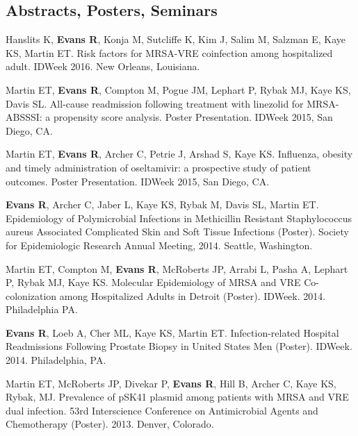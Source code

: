 \documentclass[10pt]{res} %
\begin{document}
\begin{resume}
\subsection{Abstracts, Posters, Seminars} 

\vspace{10pt}

Hanslits K, \textbf{Evans R}, Konja M, Sutcliffe K, Kim J, Salim M, Salzman E, Kaye KS,
Martin ET. Risk factors for MRSA-VRE coinfection among hospitalized adult.
IDWeek 2016. New Orleans, Louisiana.

\vspace{5pt}

Martin ET, \textbf{Evans R}, Compton M, Pogue JM, Lephart P, Rybak MJ, Kaye KS,
Davis SL. All-cause readmission following treatment with linezolid for MRSA-
ABSSSI: a propensity score analysis. Poster Presentation. IDWeek 2015, San
Diego, CA.

\vspace{5pt}

Martin ET, \textbf{Evans R}, Archer C, Petrie J, Arshad S, Kaye KS. Influenza, obesity and
timely administration of oseltamivir: a prospective study of patient outcomes. Poster
Presentation. IDWeek 2015, San Diego, CA.

\vspace{5pt}

\textbf{Evans R}, Archer C, Jaber L, Kaye KS, Rybak M, Davis SL, Martin ET. Epidemiology
of Polymicrobial Infections in Methicillin Resistant Staphylococcus aureus
Associated Complicated Skin and Soft Tissue Infections (Poster). Society for
Epidemiologic Research Annual Meeting, 2014. Seattle, Washington.

\vspace{5pt}

Martin ET, Compton M,  \textbf{Evans R}, McRoberts JP, Arrabi L, Pasha A, Lephart P,
Rybak MJ, Kaye KS. Molecular Epidemiology of MRSA and VRE Co-colonization
among Hospitalized Adults in Detroit (Poster). IDWeek. 2014. Philadelphia PA.

\vspace{5pt}

\textbf{Evans R}, Loeb A, Cher ML, Kaye KS, Martin ET. Infection-related Hospital
Readmissions Following Prostate Biopsy in United States Men (Poster). IDWeek.
2014. Philadelphia, PA.

\vspace{5pt}

Martin ET, McRoberts JP, Divekar P,  \textbf{Evans R}, Hill B, Archer C, Kaye KS, Rybak,
MJ. Prevalence of pSK41 plasmid among patients with MRSA and VRE dual
infection. 53rd Interscience Conference on Antimicrobial Agents and Chemotherapy
(Poster). 2013. Denver, Colorado.


\end{resume}
\end{document}
